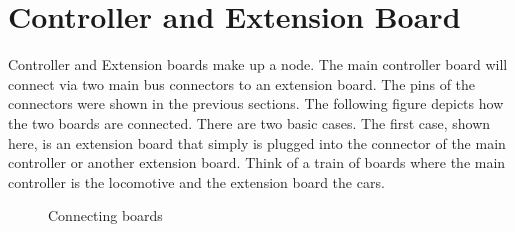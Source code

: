 \section{Controller and Extension Board}

Controller and Extension boards make up a node. The main controller board will connect via two main bus connectors to an extension board. The pins of the connectors were shown in the previous sections. The following figure depicts how the two boards are connected. There are two basic cases. The first case, shown here, is an extension board that simply is plugged into the connector of the main controller or another extension board. Think of a train of boards where the main controller is the locomotive and the extension board the cars. 

\begin{figure}[htbp]
    \centering
    \caption{Connecting boards}
\end{figure}

